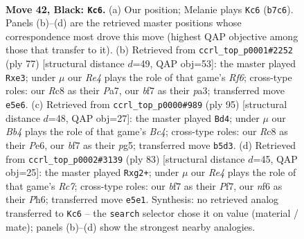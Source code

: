 \documentclass[11pt]{article}
\begin{document}
\clearpage

\begin{figure}[p]\centering
\begin{subfigure}{0.46\textwidth}\centering
\resizebox{\linewidth}{!}{%
\newchessgame
\chessboard[
  setfen={2r5/1k3B2/5N2/Rb2rp2/1P5R/8/6P1/3KN3 b - - 0 42},
  showmover=false,
  pgfstyle=straightmove, color=movearrow, markmove={b7-c6}
]}
\caption{}
\end{subfigure}\hfill
\begin{subfigure}{0.46\textwidth}\centering
\resizebox{\linewidth}{!}{%
\newchessgame
\chessboard[
  setfen={8/p3kp2/8/8/1P4Rb/P3Pr2/3R4/2rN2K1 b - - 6 39},
  showmover=false,
  pgfstyle=straightmove, color=movearrow, markmove={f3-e3}
]}
\caption{}
\end{subfigure}
\\[4pt]
\begin{subfigure}{0.46\textwidth}\centering
\resizebox{\linewidth}{!}{%
\newchessgame
\chessboard[
  setfen={4k3/2R5/4p3/2b1PpP1/8/2r3P1/4K3/5N2 b - - 0 48},
  showmover=false,
  pgfstyle=straightmove, color=movearrow, markmove={c5-d4}
]}
\caption{}
\end{subfigure}\hfill
\begin{subfigure}{0.46\textwidth}\centering
\resizebox{\linewidth}{!}{%
\newchessgame
\chessboard[
  setfen={8/2R2p2/5k1p/5r2/2b4P/P3P2R/2r3B1/6K1 b - - 5 42},
  showmover=false,
  pgfstyle=straightmove, color=movearrow, markmove={c2-g2}
]}
\caption{}
\end{subfigure}
\caption{\textbf{Move 42, Black: \texttt{Kc6}.} (a) Our position; Melanie plays \texttt{Kc6} (\texttt{b7c6}). Panels (b)--(d) are the retrieved master positions whose correspondence most drove this move (highest QAP objective among those that transfer to it). (b) Retrieved from \texttt{ccrl\_top\_p0001\#2252} (ply 77) [structural distance $d$=49, QAP obj=53]: the master played \texttt{Rxe3}; under $\mu$ our \emph{Re4} plays the role of that game's \emph{Rf6}; cross-type roles: our \emph{R}c8 as their \emph{P}a7, our \emph{b}f7 as their \emph{p}a3; transferred move \texttt{e5e6}. (c) Retrieved from \texttt{ccrl\_top\_p0000\#989} (ply 95) [structural distance $d$=48, QAP obj=27]: the master played \texttt{Bd4}; under $\mu$ our \emph{Bb4} plays the role of that game's \emph{Bc4}; cross-type roles: our \emph{R}c8 as their \emph{P}e6, our \emph{b}f7 as their \emph{p}g5; transferred move \texttt{b5d3}. (d) Retrieved from \texttt{ccrl\_top\_p0002\#3139} (ply 83) [structural distance $d$=45, QAP obj=25]: the master played \texttt{Rxg2+}; under $\mu$ our \emph{Re4} plays the role of that game's \emph{Rc7}; cross-type roles: our \emph{b}f7 as their \emph{P}f7, our \emph{n}f6 as their \emph{P}h6; transferred move \texttt{e5e1}. Synthesis: no retrieved analog transferred to \texttt{Kc6} -- the \texttt{search} selector chose it on value (material / mate); panels (b)--(d) show the strongest nearby analogies.}
\label{fig:thought-m83}
\end{figure}
\end{document}
